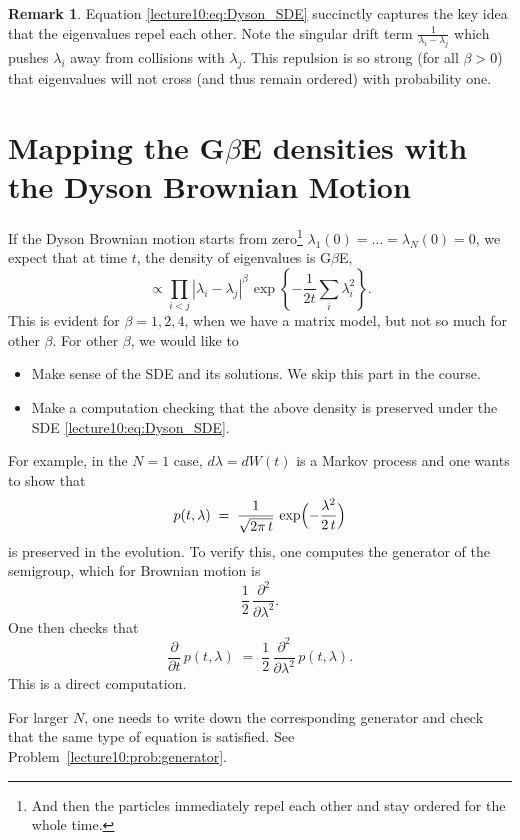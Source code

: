 \documentclass[letterpaper,11pt,oneside,reqno]{book}
\numberwithin{equation}{chapter}  %
\newcommand{\ssp}{\hspace{1pt}}
\theoremstyle{definition}
\newtheorem{remark}[proposition]{Remark}
\begin{document}
\begin{remark}
	Equation \eqref{lecture10:eq:Dyson_SDE} succinctly captures the key idea that the eigenvalues repel each other. Note the singular drift term $\frac{1}{\lambda_i-\lambda_j}$ which pushes $\lambda_i$ away from collisions with $\lambda_j$. This repulsion is so strong (for all $\beta>0$)
	that eigenvalues will not cross (and thus remain ordered) with probability one.
\end{remark}

\section{Mapping the G$\beta$E densities with the Dyson Brownian Motion}

If the Dyson Brownian motion starts from zero\footnote{And then the particles immediately
repel each other and stay ordered for the whole time.}
$\lambda_1(0)=\dots=\lambda_N(0)=0$,
we expect that at time $t$, the density of eigenvalues
is G$\beta$E,
\begin{equation*}
	\propto \prod_{i<j}|\lambda_i-\lambda_j|^{\beta}\ssp
	\exp\left\{ -\frac{1}{2t}\sum_{i}\lambda_i^2 \right\}.
\end{equation*}
This is evident for $\beta=1,2,4$, when we have a matrix model, but not so
much for other $\beta$. For other $\beta$, we would like to
\begin{itemize}
\item Make sense of the SDE and its solutions. We skip this part in the course.
\item Make a computation checking that the above density is preserved under the SDE
\eqref{lecture10:eq:Dyson_SDE}.
\end{itemize}

For example,
in the $N=1$ case, $d\lambda = dW(t)$ is a Markov process and one wants to show that
\[
p(t,\lambda) \;=\; \frac{1}{\sqrt{2\pi\,t}}\,
\exp\Bigl(-\frac{\lambda^{2}}{2\,t}\Bigr)
\]
is preserved in the evolution.  To verify this, one computes the generator
of the semigroup, which for Brownian motion is
\[
\frac{1}{2}\,\frac{\partial^{2}}{\partial\lambda^{2}}.
\]
One then checks that
\[
\frac{\partial}{\partial t}\,p(t,\lambda)
\;=\;
\frac{1}{2}\,\frac{\partial^{2}}{\partial\lambda^{2}}\,p(t,\lambda).
\]
This is a direct computation.

For larger $N$, one needs to write down the corresponding generator and check
that the same type of equation is satisfied.
See Problem~\ref{lecture10:prob:generator}.
\end{document}
